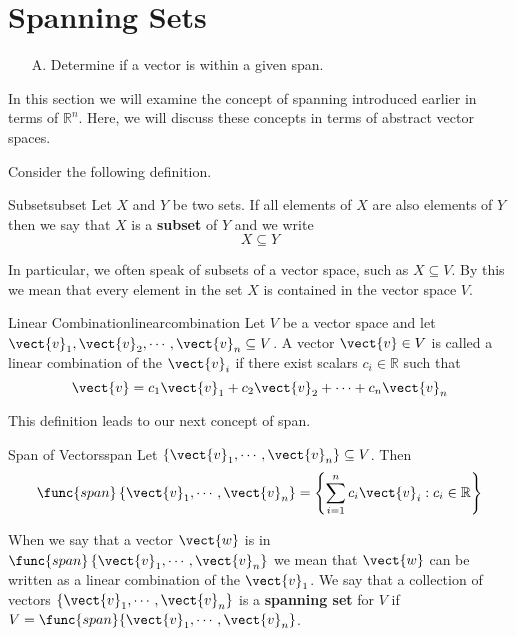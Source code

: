 \section{Spanning Sets}

\begin{outcome}
\begin{enumerate}
\item[A.] Determine if a vector is within a given span.
\end{enumerate}
\end{outcome}

In this section we will examine the concept of spanning introduced earlier in terms of $\mathbb{R}^n$. Here, we will discuss these concepts in terms of abstract vector spaces. 

Consider the following definition. 

\begin{definition}{Subset}{subset}
Let $X$ and $Y$ be two sets. If all elements of $X$ are also elements of $Y$ then we say that $X$ is a \textbf{subset} of $Y$ and we write
\[
X \subseteq Y
\]
\end{definition}

In particular, we often speak of subsets of a vector space, such as $X \subseteq V$. By this we mean that every element in the set $X$ is contained in the vector space $V$. 

\begin{definition}{Linear Combination}{linearcombination}
Let $V$ be a vector space and let $\vect{v}_1, \vect{v}_2, \cdots, \vect{v}_n \subseteq V$. A vector $\vect{v} \in V$ is called a linear combination of the $\vect{v}_i$ if there exist scalars $c_i \in \mathbb{R}$ such that 
\[
\vect{v} = c_1 \vect{v}_1 + c_2 \vect{v}_2 + \cdots + c_n \vect{v}_n
\]
\end{definition}

This definition leads to our next concept of span.

\begin{definition}{Span of Vectors}{span}
Let $\{\vect{v}_{1},\cdots ,\vect{v}_{n}\} \subseteq V$. Then
\begin{equation*}
\func{span}\left\{ \vect{v}_{1},\cdots ,\vect{v}_{n}\right\} = 
\left\{ \sum_{i=1}^{n}c_{i}\vect{v}_{i}: c_{i}\in \mathbb{R}
\right\} 
\end{equation*}
\end{definition}

When we say that a vector $\vect{w}$ is in $\func{span}\left\{ \vect{v}_{1},\cdots ,\vect{v}_{n}\right\}$ we mean that $\vect{w}$ can be written as a linear combination of the $\vect{v}_1$. We say that a collection of vectors $\{\vect{v}_{1},\cdots ,\vect{v}_{n}\}$ is a \textbf{spanning set} for $V$ if $V = \func{span} \{\vect{v}_{1},\cdots ,\vect{v}_{n}\}$. 

